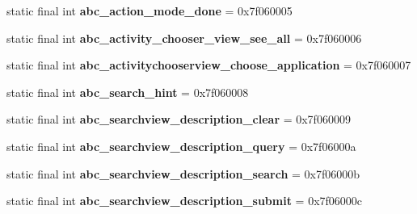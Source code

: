 \begin{DoxyCompactItemize}
\item 
\hypertarget{classandroid_1_1support_1_1design_1_1_r_1_1string_a650cb796af0ed2ed3305583ac1887224}{}static final int {\bfseries abc\+\_\+action\+\_\+mode\+\_\+done} = 0x7f060005\label{classandroid_1_1support_1_1design_1_1_r_1_1string_a650cb796af0ed2ed3305583ac1887224}

\item 
\hypertarget{classandroid_1_1support_1_1design_1_1_r_1_1string_a9b4629898f289df4ea77edefdf9f011f}{}static final int {\bfseries abc\+\_\+activity\+\_\+chooser\+\_\+view\+\_\+see\+\_\+all} = 0x7f060006\label{classandroid_1_1support_1_1design_1_1_r_1_1string_a9b4629898f289df4ea77edefdf9f011f}

\item 
\hypertarget{classandroid_1_1support_1_1design_1_1_r_1_1string_a79f096c86588827bd6ad855469b5e54b}{}static final int {\bfseries abc\+\_\+activitychooserview\+\_\+choose\+\_\+application} = 0x7f060007\label{classandroid_1_1support_1_1design_1_1_r_1_1string_a79f096c86588827bd6ad855469b5e54b}

\item 
\hypertarget{classandroid_1_1support_1_1design_1_1_r_1_1string_a49cacb037d06f1b5b99ad9093a9a78e5}{}static final int {\bfseries abc\+\_\+search\+\_\+hint} = 0x7f060008\label{classandroid_1_1support_1_1design_1_1_r_1_1string_a49cacb037d06f1b5b99ad9093a9a78e5}

\item 
\hypertarget{classandroid_1_1support_1_1design_1_1_r_1_1string_ada43ec0fa6465dcc33878e45bd9d0fdf}{}static final int {\bfseries abc\+\_\+searchview\+\_\+description\+\_\+clear} = 0x7f060009\label{classandroid_1_1support_1_1design_1_1_r_1_1string_ada43ec0fa6465dcc33878e45bd9d0fdf}

\item 
\hypertarget{classandroid_1_1support_1_1design_1_1_r_1_1string_a02e8b7161ffa91e25f2f8623cec6b2cf}{}static final int {\bfseries abc\+\_\+searchview\+\_\+description\+\_\+query} = 0x7f06000a\label{classandroid_1_1support_1_1design_1_1_r_1_1string_a02e8b7161ffa91e25f2f8623cec6b2cf}

\item 
\hypertarget{classandroid_1_1support_1_1design_1_1_r_1_1string_a6bf26a757b0d4c764952cc3795158341}{}static final int {\bfseries abc\+\_\+searchview\+\_\+description\+\_\+search} = 0x7f06000b\label{classandroid_1_1support_1_1design_1_1_r_1_1string_a6bf26a757b0d4c764952cc3795158341}

\item 
\hypertarget{classandroid_1_1support_1_1design_1_1_r_1_1string_a86402c10a07ce0ef57379f1e52663aeb}{}static final int {\bfseries abc\+\_\+searchview\+\_\+description\+\_\+submit} = 0x7f06000c\label{classandroid_1_1support_1_1design_1_1_r_1_1string_a86402c10a07ce0ef57379f1e52663aeb}


\end{DoxyCompactItemize}
